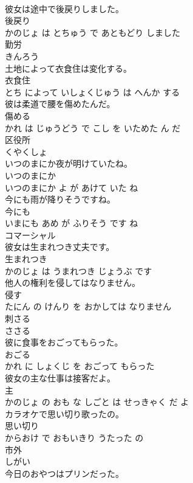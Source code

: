 \documentclass[8pt]{extreport}
\begin{document}
\begin{CJK}{UTF8}{min}
\\	彼女は途中で後戻りしました。	
\\	後戻り 
\\	かのじょ は とちゅう で あともどり しました			
\\	勤労	
\\	きんろう			
\\	土地によって衣食住は変化する。	
\\	衣食住 
\\	とち によって いしょくじゅう は へんか する			
\\	彼は柔道で腰を傷めたんだ。	
\\	傷める 
\\	かれ は じゅうどう で こし を いためた ん だ			
\\	区役所	
\\	くやくしょ			
\\	いつのまにか夜が明けていたね。	
\\	いつのまにか 
\\	いつのまにか よ が あけて いた ね			
\\	今にも雨が降りそうですね。	
\\	今にも 
\\	いまにも あめ が ふりそう です ね			
\\	コマーシャル	
\\	彼女は生まれつき丈夫です。	
\\	生まれつき 
\\	かのじょ は うまれつき じょうぶ です			
\\	他人の権利を侵してはなりません。	
\\	侵す 
\\	たにん の けんり を おかしては なりません			
\\	刺さる	
\\	ささる			
\\	彼に食事をおごってもらった。	
\\	おごる 
\\	かれ に しょくじ を おごって もらった			
\\	彼女の主な仕事は接客だよ。	
\\	主 
\\	かのじょ の おも な しごと は せっきゃく だ よ			
\\	カラオケで思い切り歌ったの。	
\\	思い切り 
\\	からおけ で おもいきり うたった の			
\\	市外	
\\	しがい			
\\	今日のおやつはプリンだった。	

\end{CJK}
\end{document}
